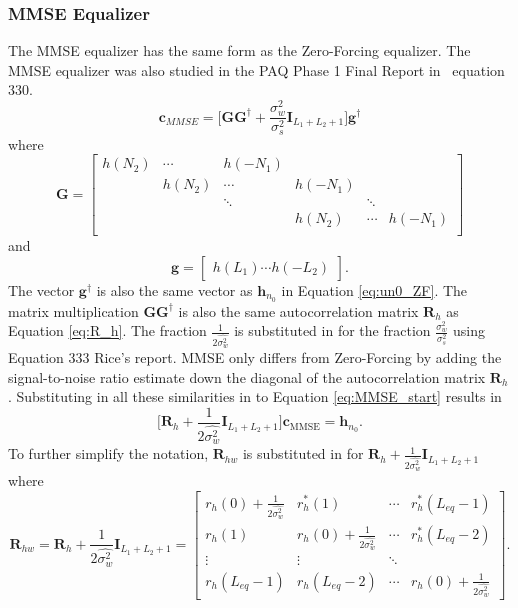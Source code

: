 \subsubsection{MMSE Equalizer}
The MMSE equalizer has the same form as the Zero-Forcing equalizer. 
The MMSE equalizer was also studied in the PAQ Phase 1 Final Report in ~equation 330.
\begin{equation}
\mathbf{c}_{MMSE} = \big[ \mathbf{G}\mathbf{G}^\dagger + \frac{\sigma_w^2}{\sigma_s^2}\mathbf{I}_{L_1+L_2+1} \big] \mathbf{g}^\dagger
\label{eq:MMSE_start}
\end{equation}
where
\begin{equation}
\mathbf{G} = 
		\begin{bmatrix}
		h(N_2)		& \cdots	& h(-N_1) 	&  			\\
					& h(N_2)	& \cdots 	& h(-N_1)	\\
				 	& 			& \ddots 	&  			& \ddots	\\
		 			&  	   		&  			& h(N_2)	& \cdots	& h(-N_1)	\\
	\end{bmatrix}
\end{equation}
and
\begin{equation}
\mathbf{g} = \begin{bmatrix} h(L_1) \cdots h(-L_2) \end{bmatrix}.
\end{equation}
The vector $\mathbf{g}^\dagger$ is also the same vector as $\mathbf{h}_{n_0}$ in Equation \eqref{eq:un0_ZF}.
The matrix multiplication $\mathbf{G}\mathbf{G}^\dagger$ is also the same autocorrelation matrix $\mathbf{R}_h$ as Equation \eqref{eq:R_h}.
The fraction $\frac{1}{2\hat{\sigma^2_w}}$ is substituted in for the fraction $\frac{\sigma_w^2}{\sigma_s^2}$ using Equation 333 Rice's report.
MMSE only differs from Zero-Forcing by adding the signal-to-noise ratio estimate down the diagonal of the autocorrelation matrix $\mathbf{R}_h$.
Substituting in all these similarities in to Equation \eqref{eq:MMSE_start} results in
\begin{equation}
\big[ \mathbf{R}_h + \frac{1}{2\hat{\sigma^2_w}} \mathbf{I}_{L_1+L_2+1} \big] \mathbf{c}_\text{MMSE} = \mathbf{h}_{n_0}.
\label{eq:c_MMSE_solve1}
\end{equation}
To further simplify the notation, $\mathbf{R}_{hw}$ is substituted in for $\mathbf{R}_h + \frac{1}{2\hat{\sigma^2_w}} \mathbf{I}_{L_1+L_2+1}$ where
\begin{equation}
\mathbf{R}_{hw} = 
\mathbf{R}_h + \frac{1}{2\hat{\sigma^2_w}} \mathbf{I}_{L_1+L_2+1} = 
		\begin{bmatrix}
		r_{h}(0) + \frac{1}{2\hat{\sigma^2_w}}	& r^\ast_{h}(1)							& \cdots 	& r^\ast_{h}(L_{eq}-1)  	\\
		r_{h}(1) 								& r_{h}(0) + \frac{1}{2\hat{\sigma^2_w}}& \cdots 	& r^\ast_{h}(L_{eq}-2)  	\\
		\vdots	 								& \vdots								& \ddots 	&  							\\
		r_{h}(L_{eq}-1)							& r_{h}(L_{eq}-2)						& \cdots	& r_{h}(0) + \frac{1}{2\hat{\sigma^2_w}}  			
	\end{bmatrix}.
	\label{eq:R_MMSE}
\end{equation}

